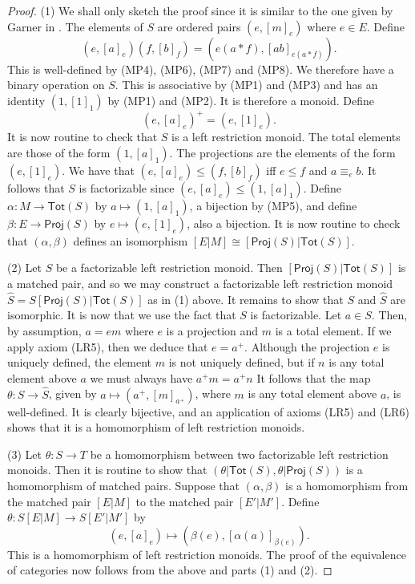 \documentclass[a4paper]{amsart}
\begin{document}
\begin{proof}
(1) We shall only sketch the proof since it is similar to the one given by Garner in \cite{G2025}.
The elements of $S$ are ordered pairs $(e, [m]_{e})$ where $e \in E$.
Define
$$(e,[a]_{e})(f,[b]_{f}) = (e(a \ast f), [ab]_{e(a \ast f)}).$$
This is well-defined by (MP4), (MP6), (MP7) and (MP8).
We therefore have a binary operation on $S$.
This is associative by (MP1) and (MP3) and has an identity $(1,[1]_{1})$ by (MP1) and (MP2).
It is therefore a monoid.
Define 
$$(e,[a]_{e})^{+} = (e,[1]_{e}).$$
It is now routine to check that $S$ is a left restriction monoid.
The total elements are those of the form $(1,[a]_{1})$.
The projections are the elements of the form $(e,[1]_{e})$.
We have that $(e,[a]_{e}) \leq (f,[b]_{f})$ iff $e \leq f$ and $a \equiv_{e} b$.
It follows that $S$ is factorizable since $(e,[a]_{e}) \leq (1,[a]_{1})$.
Define $\alpha \colon M \rightarrow \mathsf{Tot}(S)$ by $a \mapsto (1,[a]_{1})$,
a bijection by (MP5),
and define $\beta \colon E \rightarrow \mathsf{Proj}(S)$ by $e \mapsto (e,[1]_{e})$, also a bijection.
It is now routine to check that $(\alpha, \beta)$ defines an isomorphism $[E|M] \cong [\mathsf{Proj}(S)|\mathsf{Tot}(S)]$.

(2) Let $S$ be a factorizable left restriction monoid.
Then $[\mathsf{Proj}(S)|\mathsf{Tot}(S)]$ is a matched pair, and so we may construct a factorizable left restriction monoid
$\hat{S} = S[\mathsf{Proj}(S)|\mathsf{Tot}(S)]$ as in (1) above.
It remains to show that $S$ and $\hat{S}$ are isomorphic.
It is now that we use the fact that $S$ is factorizable.
Let $a \in S$.
Then, by assumption, $a = em$ where $e$ is a projection and $m$ is a total element.
If we apply axiom (LR5), then we deduce that $e = a^{+}$.
Although the projection $e$ is uniquely defined,
the element $m$ is not uniquely defined, but if $n$ is any total element above $a$ we must always have $a^{+}m = a^{+}n$
It follows that the map $\theta \colon S \rightarrow \hat{S}$, given by $a \mapsto (a^{+}, [m]_{a^{+}})$, where $m$ is any total element above $a$,
is well-defined.
It is clearly bijective, and an application of axioms (LR5) and (LR6) shows that it is a homomorphism of left restriction monoids.

(3) Let $\theta \colon S \rightarrow T$ be a homomorphism between two factorizable left restriction monoids.
Then it is routine to show that $(\theta | \mathsf{Tot}(S), \theta | \mathsf{Proj}(S))$ is a homomorphism of matched pairs.
Suppose that $(\alpha, \beta)$ is a homomorphism from the matched pair  $[E|M]$ to  the matched pair $[E'|M']$.
Define $\theta \colon S[E|M] \rightarrow S[E'|M']$ by 
$$(e, [a]_{e}) \mapsto (\beta (e), [\alpha (a)]_{\beta (e)}).$$
This is a homomorphism of left restriction monoids. 
The proof of the equivalence of categories now follows from the above and parts (1) and (2).
\end{proof}
\end{document}
